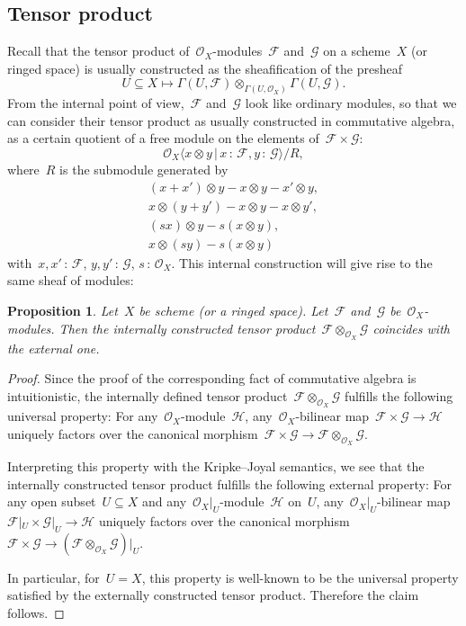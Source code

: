 \documentclass[10pt]{amsart}
\theoremstyle{definition}
\theoremstyle{plain}
\newtheorem{prop}[defn]{Proposition}
\theoremstyle{remark}
\newcommand{\F}{\mathcal{F}}
\newcommand{\G}{\mathcal{G}}
\renewcommand{\H}{\mathcal{H}}
\renewcommand{\O}{\mathcal{O}}
\newcommand{\?}{\,{:}\,}
\renewcommand{\_}{\mathpunct{.}\,}
\begin{document}
\subsection{Tensor product} Recall that the tensor product
of~$\O_X$-modules~$\F$ and~$\G$ on a scheme~$X$ (or ringed space) is usually
constructed as the sheafification of the presheaf
\[ U \subseteq X \longmapsto \Gamma(U,\F) \otimes_{\Gamma(U,\O_X)}
\Gamma(U,\G). \]
From the internal point of view,~$\F$ and~$\G$ look like ordinary modules, so
that we can consider their tensor product as usually constructed in
commutative algebra, as a certain quotient of a free module on the elements
of~$\F \times \G$:
\[ \O_X\langle x \otimes y \,|\, x\?\F, y\?\G \rangle / R, \]
where~$R$ is the submodule generated by
\begin{gather*}
  (x+x') \otimes y - x \otimes y - x' \otimes y, \\
  x \otimes (y+y') - x \otimes y - x \otimes y', \\
  (sx) \otimes y - s(x \otimes y), \\
  x \otimes (sy) - s(x \otimes y)
\end{gather*}
with~$x,x'\?\F$, $y,y'\?\G$, $s\?\O_X$.
This internal construction will give rise to the same sheaf
of modules:

\begin{prop}Let~$X$ be scheme (or a ringed space). Let~$\F$ and~$\G$
be~$\O_X$-modules. Then the internally constructed tensor product~$\F
\otimes_{\O_X} \G$ coincides with the external one.
\end{prop}
\begin{proof}
Since the proof of the corresponding fact of commutative algebra is
intuitionistic, the internally defined tensor product~$\F \otimes_{\O_X} \G$
fulfills the following universal property: For any~$\O_X$-module~$\H$,
any~$\O_X$-bilinear map~$\F \times \G \to \H$ uniquely factors over the
canonical morphism~$\F \times \G \to \F \otimes_{\O_X} \G$.

Interpreting this property with the Kripke--Joyal semantics, we see that the
internally constructed tensor product fulfills the following external property:
For any open subset~$U \subseteq X$ and any~$\O_X|_U$-module~$\H$ on~$U$,
any~$\O_X|_U$-bilinear map~$\F|_U \times \G|_U \to \H$ uniquely factors over the
canonical morphism~$\F \times \G \to (\F \otimes_{\O_X} \G)|_U$.

In particular, for~$U = X$, this property is well-known to be the universal
property satisfied by the externally constructed tensor product. Therefore the
claim follows.
\end{proof}
\end{document}
